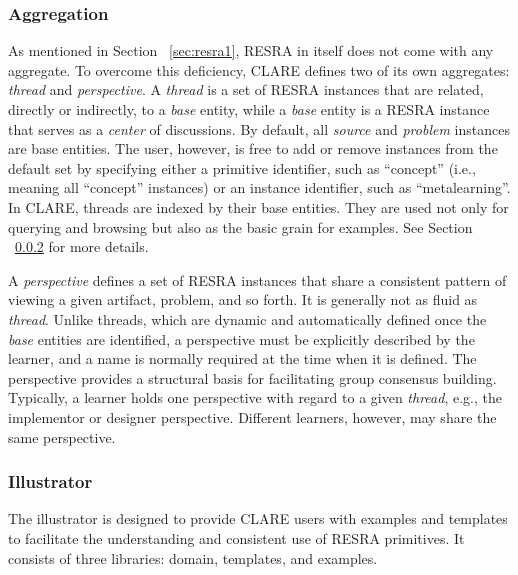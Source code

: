 \subsubsection{Aggregation}

As mentioned in Section ~\ref{sec:resra1}, RESRA in itself does not come
with any aggregate. To overcome this deficiency, CLARE defines two of its
own aggregates: {\it thread\/} and {\it perspective\/}. A {\it thread\/} is
a set of RESRA instances that are related, directly or indirectly, to a
{\it base\/} entity, while a {\it base\/} entity is a RESRA instance that
serves as a {\it center\/} of discussions. By default, all {\it source\/}
and {\it problem\/} instances are base entities. The user, however, is free
to add or remove instances from the default set by specifying either a
primitive identifier, such as ``concept'' (i.e., meaning all ``concept''
instances) or an instance identifier, such as ``metalearning''. In CLARE,
threads are indexed by their base entities. They are used not only for
querying and browsing but also as the basic grain for examples. See Section
~\ref{sec:illustrator} for more details.

A {\it perspective \/} defines a set of RESRA instances that share a
consistent pattern of viewing a given artifact, problem, and so forth. It
is generally not as fluid as {\it thread\/}. Unlike threads, which are
dynamic and automatically defined once the {\it base\/} entities are
identified, a perspective must be explicitly described by the learner, and
a name is normally required at the time when it is defined. The perspective
provides a structural basis for facilitating group consensus building.
Typically, a learner holds one perspective with regard to a given {\it
thread\/}, e.g., the implementor or designer perspective. Different
learners, however, may share the same perspective.


\subsubsection{Illustrator}
\label{sec:illustrator}

The illustrator is designed to provide CLARE users with examples and
templates to facilitate the understanding and consistent use of RESRA
primitives. It consists of three libraries: domain, templates, and
examples.

